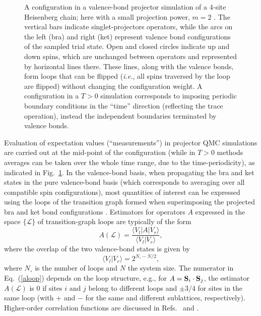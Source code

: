 \documentclass[range]{ar2e}
\begin{document}
\begin{figure}
\centerline{}
\caption{A configuration in a valence-bond projector simulation of a 4-site Heisenberg chain; here with a small projection power, 
$m=2$ \cite{Sandvik10a}. The vertical bars indicate singlet-projectors operators, while the arcs on the left (bra) and right (ket) represent 
valence bond configurations of the sampled trial state. Open and closed circles indicate up and down spins, which are unchanged between 
operators and represented by horizontal lines there. These lines, along with the valence bonds, form loops that can be flipped ({\em i.e.}, 
all spins traversed by the loop are flipped) without changing the configuration weight. A configuration in a $T>0$ simulation corresponds 
to imposing periodic boundary conditions in the ``time'' direction (reflecting the trace operation), instead the independent boundaries 
terminated by valence bonds.}
\label{loops}
\end{figure}

Evaluation of expectation values (``measurements'') in projector QMC simulations are carried out at the mid-point of the configuration (while in $T>0$
methods averages can be taken over the whole time range, due to the time-periodicity), as indicated 
in Fig.~\ref{loops}. In the valence-bond basis, when propagating the bra and ket states in the pure valence-bond basis (which corresponds to averaging 
over all compatible spin configurations), most quantities of interest can be expressed using the loops of the transition graph formed when superimposing 
the projected bra and ket bond configurations \cite{Liang88,Sutherland88}. Estimators for operators $A$ expressed in the space $\{\mathcal{L}\}$ of 
transition-graph loops are typically of the form
\begin{equation}
A(\mathcal{L}) = \frac{\langle V_l|A|V_r\rangle}{\langle V_l|V_r \rangle},
\label{aloop}
\end{equation}
where the overlap of the two valence-bond states is given by
\begin{equation}
\langle V_l|V_r\rangle = 2^{N_\circ - N/2},
\label{vboverlap}
\end{equation}
where $N_\circ$ is the number of loops and $N$ the system size. The numerator in Eq.~(\ref{aloop}) depends on the loop structure, 
e.g., for $A={\bf S}_i \cdot {\bf S}_j$, the estimator $A(\mathcal{L})$ is $0$ if sites $i$ and $j$ belong to different loops and $\pm 3/4$ for 
sites in the same loop (with $+$ and $-$ for the same and different sublattices, respectively). Higher-order correlation functions are discussed 
in Refs.~\cite{Beach06} and \cite{Tang11b}.
\end{document}
